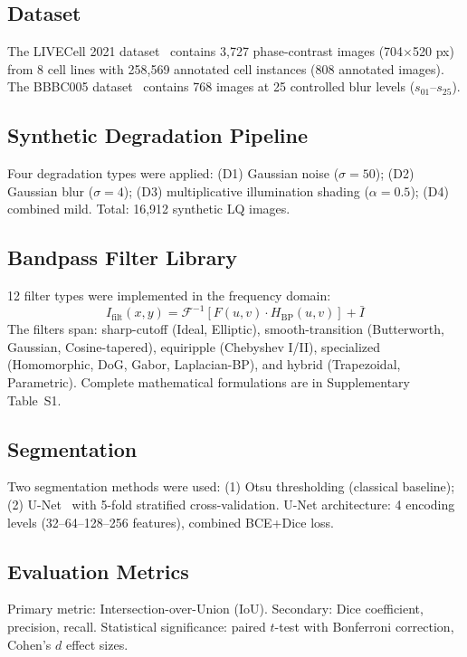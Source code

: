 \documentclass[11pt,a4paper]{article}
\begin{document}
\subsection{Dataset}
The LIVECell 2021 dataset~\cite{edlund2021livecell} contains 3,727 phase-contrast images (704$\times$520 px) from 8 cell lines with 258,569 annotated cell instances (808 annotated images). The BBBC005 dataset~\cite{ljosa2012annotated} contains 768 images at 25 controlled blur levels ($s_{01}$--$s_{25}$).

\subsection{Synthetic Degradation Pipeline}
Four degradation types were applied: (D1) Gaussian noise ($\sigma{=}50$); (D2) Gaussian blur ($\sigma{=}4$); (D3) multiplicative illumination shading ($\alpha{=}0.5$); (D4) combined mild. Total: 16,912 synthetic LQ images.

\subsection{Bandpass Filter Library}
12 filter types were implemented in the frequency domain:
\begin{equation}
I_{\text{filt}}(x,y) = \mathcal{F}^{-1}\left[F(u,v) \cdot H_{\text{BP}}(u,v)\right] + \bar{I}
\end{equation}
The filters span: sharp-cutoff (Ideal, Elliptic), smooth-transition (Butterworth, Gaussian, Cosine-tapered), equiripple (Chebyshev I/II), specialized (Homomorphic, DoG, Gabor, Laplacian-BP), and hybrid (Trapezoidal, Parametric). Complete mathematical formulations are in Supplementary Table~S1.

\subsection{Segmentation}
Two segmentation methods were used: (1) Otsu thresholding (classical baseline); (2) U-Net~\cite{ronneberger2015u} with 5-fold stratified cross-validation. U-Net architecture: 4 encoding levels (32--64--128--256 features), combined BCE+Dice loss.

\subsection{Evaluation Metrics}
Primary metric: Intersection-over-Union (IoU). Secondary: Dice coefficient, precision, recall. Statistical significance: paired $t$-test with Bonferroni correction, Cohen's $d$ effect sizes.
\end{document}
